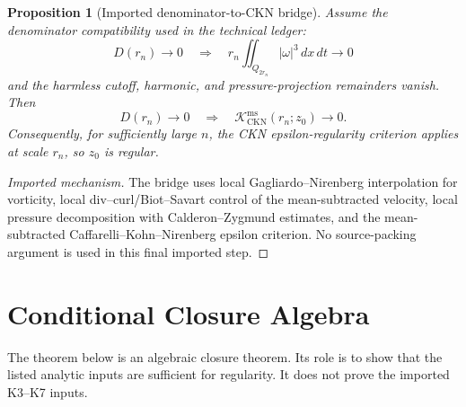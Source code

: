 \documentclass[11pt]{article}
\newtheorem{proposition}{Proposition}
\begin{document}
\begin{proposition}[Imported denominator-to-CKN bridge]
\label{prop:CKN-bridge}
Assume the denominator compatibility used in the technical ledger:
\[
D(r_n)\to0
\quad\Longrightarrow\quad
r_n\iint_{Q_{2r_n}}|\omega|^3\,dx\,dt\to0
\]
and the harmless cutoff, harmonic, and pressure-projection remainders vanish.
Then
\[
D(r_n)\to0
\quad\Longrightarrow\quad
\mathcal K_{\mathrm{CKN}}^{\mathrm{ms}}(r_n;z_0)\to0.
\]
Consequently, for sufficiently large \(n\), the CKN epsilon-regularity
criterion applies at scale \(r_n\), so \(z_0\) is regular.
\end{proposition}

\begin{proof}[Imported mechanism]
The bridge uses local Gagliardo--Nirenberg interpolation for vorticity, local
div--curl/Biot--Savart control of the mean-subtracted velocity, local pressure
decomposition with Calderon--Zygmund estimates, and the mean-subtracted
Caffarelli--Kohn--Nirenberg epsilon criterion.  No source-packing argument is
used in this final imported step.
\end{proof}

\clearpage
\section{Conditional Closure Algebra}
\label{sec:conditional-theorem}

The theorem below is an algebraic closure theorem.  Its role is to show that
the listed analytic inputs are sufficient for regularity.  It does not prove
the imported K3--K7 inputs.
\end{document}

